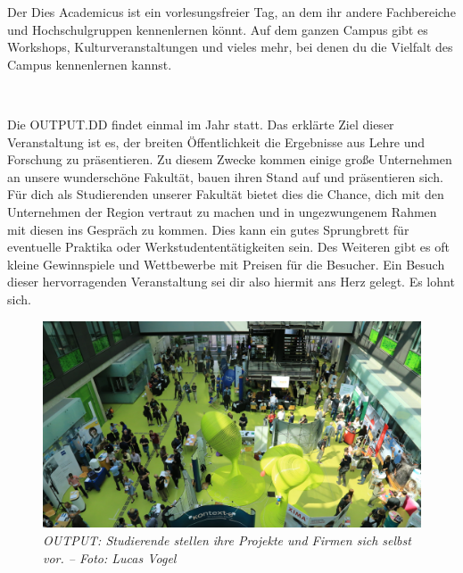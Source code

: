 Der Dies Academicus ist ein vorlesungsfreier Tag, an dem ihr andere Fachbereiche und Hochschulgruppen kennenlernen könnt. Auf dem ganzen Campus gibt es Workshops, Kulturveranstaltungen und vieles mehr, bei denen du die Vielfalt des Campus kennenlernen kannst.


\pagebreak

\
\thispagestyle{empty}

\pagebreak


Die OUTPUT.DD findet einmal im Jahr statt. Das erklärte Ziel dieser Veranstaltung ist es, der breiten Öffentlichkeit die Ergebnisse aus Lehre und Forschung zu präsentieren. Zu diesem Zwecke kommen einige große Unternehmen an unsere wunderschöne Fakultät, bauen ihren Stand auf und präsentieren sich. Für dich als Studierenden unserer Fakultät bietet dies die Chance, dich mit den Unternehmen der Region vertraut zu machen und in ungezwungenem Rahmen mit diesen ins Gespräch zu kommen. Dies kann ein gutes Sprungbrett für eventuelle Praktika oder Werkstudententätigkeiten sein. Des Weiteren gibt es oft kleine Gewinnspiele und Wettbewerbe mit Preisen für die Besucher. Ein Besuch dieser hervorragenden Veranstaltung sei dir also hiermit ans Herz gelegt. Es lohnt sich.

\begin{figure}[b!]
	\centering
  \includegraphics[width=\linewidth]{img/output}
  \caption*{\small \centering \textit{OUTPUT\@: Studierende stellen ihre Projekte und Firmen sich selbst vor. -- Foto: Lucas Vogel}}
\end{figure}%


